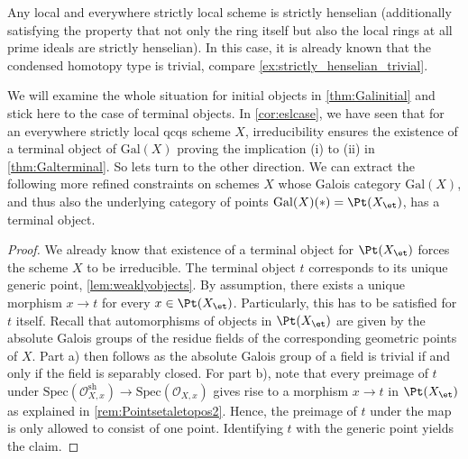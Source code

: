 \documentclass[leqno]{article}
\renewcommand{\Gal}{\mathrm{Gal}}
\renewcommand{\Spec}{\mathrm{Spec}}
\begin{document}
%
\begin{remark}
Any local and everywhere strictly local scheme is strictly henselian (additionally satisfying the property that not only the ring itself but also the local rings at all prime ideals are strictly henselian).
In this case, it is already known that the condensed homotopy type is trivial, compare \cref{ex:strictly_henselian_trivial}. 
\end{remark}
We will examine the whole situation for initial objects in \cref{thm:Galinitial} and stick here to the case of terminal objects.
In \cref{cor:eslcase}, we have seen that for an everywhere strictly local qcqs scheme $X$, irreducibility ensures the existence of a terminal object of $\Gal(X)$ proving the implication (i) to (ii) in  \cref{thm:Galterminal}.
So lets turn to the other direction.
We can extract the following more refined constraints on schemes $X$ whose Galois category $\Gal(X)$, and thus also the underlying category of points $\Gal(X)(\ast)=\Pt(X_{\et})$, has a terminal object.
\begin{proof}
We already know that existence of a terminal object for $\Pt(X_{\et})$ forces the scheme $X$ to be irreducible. The terminal object $t$ corresponds to its unique generic point, \cref{lem:weaklyobjects}.
By assumption, there exists a unique morphism $x\rightarrow t$ for every $x \in \Pt(X_{\et})$.
Particularly, this has to be satisfied for $t$ itself.
Recall that automorphisms of objects in $\Pt(X_{\et})$ are given by the absolute Galois groups of the residue fields of the corresponding geometric points of $X$.
Part a) then follows as the absolute Galois group of a field is trivial if and only if the field is separably closed. For part b), note that every preimage of $t$ under $\Spec(\mathcal{O}_{X,x}^{\mathrm{sh}}) \rightarrow \Spec(\mathcal{O}_{X,x})$ gives rise to a morphism $x\rightarrow t$ in $\Pt(X_{\et})$ as explained in \cref{rem:Pointsetaletopos2}.
Hence, the preimage of $t$ under the map is only allowed to consist of one point.
Identifying $t$ with the generic point yields the claim.
\end{proof}
\end{document}
